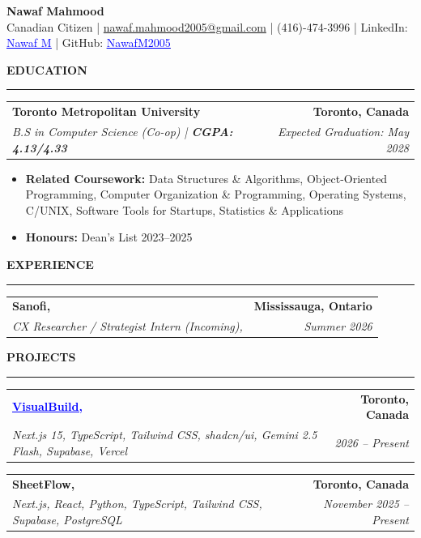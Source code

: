 \documentclass[10pt]{article}
\newcommand{\resumesection}[1]{
  \vspace{2pt}
  {\textbf{#1}}\par
  \vspace{-6pt} %
  \rule{\textwidth}{0.5pt}\vspace{1pt}
}
\newcommand{\twoLineHeading}[4]{
  \begin{tabularx}{\textwidth}{X r}
    \textbf{#1} & \textbf{#2} \\
    \textit{#3} & \textit{#4} \\
  \end{tabularx}\vspace{-2pt}
}
\newcommand{\blueuline}[1]{\textcolor{blue}{\uline{#1}}}
\begin{document}
\RaggedRight
\normalsize        %
\color{black}      %

\begin{center}
  {\LARGE \textbf{Nawaf Mahmood}}\\[-2pt]
  \large %
  Canadian Citizen \;|\;
  \href{mailto:nawaf.mahmood2005@gmail.com}{nawaf.mahmood2005@gmail.com} \;|\;
  (416)-474-3996 \;|\;
  LinkedIn: \href{https://www.linkedin.com/in/nawaf2005/}{\blueuline{Nawaf M}} \;|\;
  GitHub: \href{https://github.com/NawafM2005}{\blueuline{NawafM2005}}
\end{center}

\resumesection{EDUCATION}
\twoLineHeading
{Toronto Metropolitan University}{Toronto, Canada}
{B.S in Computer Science (Co-op) \;|\; \textbf{CGPA: 4.13/4.33}}{Expected Graduation: May 2028}

\begin{itemize}
  \item \textbf{Related Coursework:} Data Structures \& Algorithms, Object-Oriented Programming, Computer Organization \& Programming, Operating Systems, C/UNIX, Software Tools for Startups, Statistics \& Applications
  \item \textbf{Honours:} Dean's List 2023--2025
\end{itemize}

\resumesection{EXPERIENCE}
\twoLineHeading
{Sanofi,}{Mississauga, Ontario}
{CX Researcher / Strategist Intern (Incoming),}{Summer 2026}

\resumesection{PROJECTS}

\twoLineHeading
{\href{https://visualbuild.ca}{\blueuline{VisualBuild,}}}{Toronto, Canada}
{Next.js 15, TypeScript, Tailwind CSS, shadcn/ui, Gemini 2.5 Flash, Supabase, Vercel}{2026 -- Present}

\begin{itemize}
\end{itemize}

\vspace{1pt}

\twoLineHeading
{SheetFlow,}{Toronto, Canada}
{Next.js, React, Python, TypeScript, Tailwind CSS, Supabase, PostgreSQL}{November 2025 -- Present}

\begin{itemize}
\end{itemize}
\end{document}
